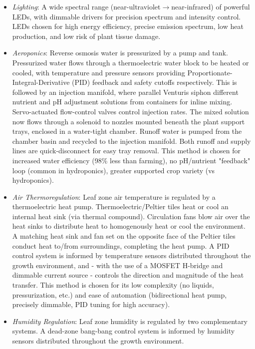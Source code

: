 \documentclass{report}
\begin{document}
\begin{itemize}
    \item\textit{Lighting}: A wide spectral range (near-ultraviolet$\to$near-infrared) of powerful LEDs, with dimmable drivers for precision spectrum and intensity control. LEDs chosen for high energy efficiency, precise emission spectrum, low heat production, and low risk of plant tissue damage.
    \item \textit{Aeroponics}: Reverse osmosis water is pressurized by a pump and tank. Pressurized water flows through a thermoelectric water block to be heated or cooled, with temperature and pressure sensors providing Proportionate-Integral-Derivative (PID) feedback and safety cutoffs respectively. This is followed by an injection manifold, where parallel Venturis siphon different nutrient and pH adjustment solutions from containers for inline mixing. Servo-actuated flow-control valves control injection rates. The mixed solution now flows through a solenoid to nozzles mounted beneath the plant support trays, enclosed in a water-tight chamber. Runoff water is pumped from the chamber basin and recycled to the injection manifold. Both runoff and supply lines are quick-disconnect for easy tray removal. This method is chosen for increased water efficiency (98\% less than farming), no pH/nutrient "feedback" loop (common in hydroponics), greater supported crop variety (vs hydroponics).
    \item \textit{Air Thermoregulation}: Leaf zone air temperature is regulated by a thermoelectric heat pump. Thermoelectric/Peltier tiles heat or cool an internal heat sink (via thermal compound). Circulation fans blow air over the heat sinks to distribute heat to homogenously heat or cool the environment. A matching heat sink and fan set on the opposite face of the Peltier tiles conduct heat to/from surroundings, completing the heat pump. A PID control system is informed by temperature sensors distributed throughout the growth environment, and - with the use of a MOSFET H-bridge and dimmable current source - controls the direction and magnitude of the heat transfer. This method is chosen for its low complexity (no liquids, pressurization, etc.) and ease of automation (bidirectional heat pump, precisely dimmable, PID tuning for high accuracy).
    \item \textit{Humidity Regulation}: Leaf zone humidity is regulated by two complementary systems. A dead-zone bang-bang control system is informed by humidity sensors distributed throughout the growth environment.
\newpage
    \begin{itemize}

\end{itemize}
\end{itemize}
\end{document}
